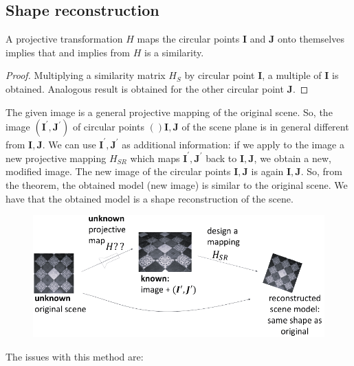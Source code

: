 \documentclass[12pt, a4paper]{report}
\begin{document}
    \subsection{Shape reconstruction}
    \begin{theorem}
        A projective transformation $H$ maps the circular points $\boldsymbol{I}$ and $\boldsymbol{J}$ onto themselves implies that and 
        implies from $H$ is a similarity. 
    \end{theorem}
    \begin{proof}
        Multiplying a similarity matrix $H_S$ by circular point $\boldsymbol{I}$, a multiple of $\boldsymbol{I}$ is obtained. Analogous 
        result is obtained for the other circular point $\boldsymbol{J}$. 
    \end{proof}
    The given image is a general projective mapping of the original scene. So, the image $(\boldsymbol{I}^{'},\boldsymbol{J}^{'})$ of 
    circular points $()\boldsymbol{I},\boldsymbol{J}$ of the scene plane is in general different from $\boldsymbol{I},\boldsymbol{J}$.
    We can use $\boldsymbol{I}^{'},\boldsymbol{J}^{'}$ as additional information: if we apply to the image a new projective
    mapping $H_{SR}$ which maps $\boldsymbol{I}^{'},\boldsymbol{J}^{'}$ back to $\boldsymbol{I},\boldsymbol{J}$, we obtain a new, 
    modified image. The new image of the circular points $\boldsymbol{I},\boldsymbol{J}$ is again $\boldsymbol{I},\boldsymbol{J}$. 
    So, from the theorem, the obtained model (new image) is similar to the original scene. We have that the obtained model is a shape 
    reconstruction of the scene. 
    \begin{figure}[H]
        \centering
        \includegraphics[width=0.75\linewidth]{images/HSR.png}
    \end{figure}
    The issues with this method are: 
\end{document}
